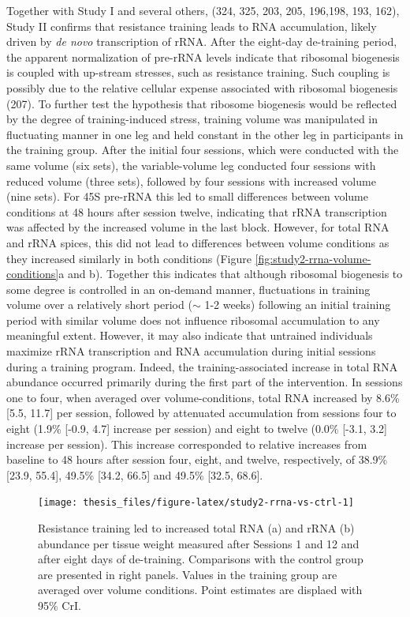 \documentclass[twoside,10pt]{gihclass} %
\begin{document}
Together with Study I and several others,
(324, 325, 203, 205, 196,198, 193, 162),
Study II confirms that resistance training leads to RNA accumulation, likely driven by \emph{de novo} transcription of rRNA. After the eight-day de-training period, the apparent normalization of pre-rRNA levels indicate that ribosomal biogenesis is coupled with up-stream stresses, such as resistance training. Such coupling is possibly due to the relative cellular expense associated with ribosomal biogenesis (207).
To further test the hypothesis that ribosome biogenesis would be reflected by the degree of training-induced stress, training volume was manipulated in fluctuating manner in one leg and held constant in the other leg in participants in the training group.
After the initial four sessions, which were conducted with the same volume (six sets), the variable-volume leg conducted four sessions with reduced volume (three sets), followed by four sessions with increased volume (nine sets). For 45S pre-rRNA this led to small differences between volume conditions at 48 hours after session twelve, indicating that rRNA transcription was affected by the increased volume in the last block.
However, for total RNA and rRNA spices, this did not lead to differences between volume conditions as they increased similarly in both conditions (Figure \ref{fig:study2-rrna-volume-conditions}a and b). Together this indicates that although ribosomal biogenesis to some degree is controlled in an on-demand manner, fluctuations in training volume over a relatively short period (\(\sim\) 1-2 weeks) following an initial training period with similar volume does not influence ribosomal accumulation to any meaningful extent.
However, it may also indicate that untrained individuals maximize rRNA transcription and RNA accumulation during initial sessions during a training program.
Indeed, the training-associated increase in total RNA abundance occurred primarily during the first part of the intervention. In sessions one to four, when averaged over volume-conditions, total RNA increased by 8.6\% {[}5.5, 11.7{]} per session, followed by attenuated accumulation from sessions four to eight (1.9\% {[}-0.9, 4.7{]} increase per session) and eight to twelve (0.0\% {[}-3.1, 3.2{]} increase per session). This increase corresponded to relative increases from baseline to 48 hours after session four, eight, and twelve, respectively, of 38.9\% {[}23.9, 55.4{]}, 49.5\% {[}34.2, 66.5{]} and 49.5\% {[}32.5, 68.6{]}.
\begin{figure}

{\centering \texttt{[image: thesis\_files/figure-latex/study2-rrna-vs-ctrl-1]} 

}

\caption[Total RNA and rRNA changes in response to resistance training in Study II.]{Resistance training led to increased total RNA (a) and rRNA (b) abundance per tissue weight measured after Sessions 1 and 12 and after eight days of de-training. Comparisons with the control group are presented in right panels. Values in the training group are averaged over volume conditions. Point estimates are displaed with 95\% CrI.}\label{fig:study2-rrna-vs-ctrl}
\end{figure}
\end{document}
